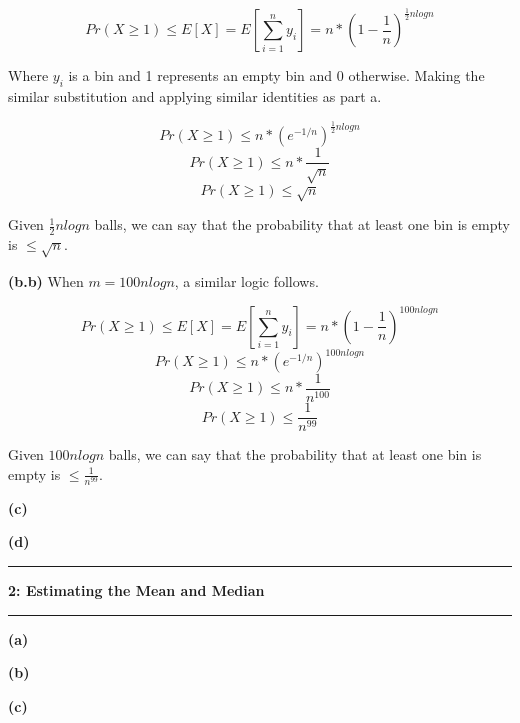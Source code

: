 \documentclass[11pt]{article}
\newcommand\question[2]{\vspace{.25in}\hrule\textbf{#1: #2}\vspace{.5em}\hrule\vspace{.10in}}
\renewcommand\part[1]{\vspace{.10in}\textbf{(#1)}}
\begin{document}
$$Pr(X \geq 1) \leq E[X] = E[\sum_{i = 1}^n y_i] = n * (1 - \frac{1}{n})^{\frac{1}{2} n log n}$$

Where $y_i$ is a bin and 1 represents an empty bin and 0 otherwise. Making the similar substitution and applying similar identities as part a.

$$Pr(X \geq 1) \leq n * (e^{-1/n})^{\frac{1}{2} n log n}$$
$$Pr(X \geq 1) \leq n * \frac{1}{\sqrt{n}}$$
$$Pr(X \geq 1) \leq \sqrt{n}$$

Given $\frac{1}{2} n log n$ balls, we can say that the probability that at least one bin is empty is $\leq \sqrt{n}$.


\part{b.b} When $m = 100 n log n$, a similar logic follows.

$$Pr(X \geq 1) \leq E[X] = E[\sum_{i = 1}^n y_i] = n * (1 - \frac{1}{n})^{100 n log n}$$
$$Pr(X \geq 1) \leq n * (e^{-1/n})^{100 n log n}$$
$$Pr(X \geq 1) \leq n * \frac{1}{n^{100}}$$
$$Pr(X \geq 1) \leq \frac{1}{n^{99}}$$

Given $100 n log n$ balls, we can say that the probability that at least one bin is empty is $\leq \frac{1}{n^{99}}$.


\part{c}

\part{d}

\question{2}{Estimating the Mean and Median}

\part{a}

\part{b}

\part{c}
\end{document}
